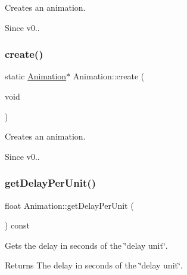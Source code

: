 Creates an animation. \begin{DoxySince}{Since}
v0.. 
\end{DoxySince}
\mbox{\label{classAnimation_ae15070d95f9de1a22d3b897570cda695}} 
\subsubsection{\texorpdfstring{create()}{create()}\hspace{0.1cm}{\footnotesize\ttfamily [2/2]}}
{\footnotesize\ttfamily static \hyperlink{classAnimation}{Animation}$\ast$ Animation\+::create (\begin{DoxyParamCaption}\item[{void}]{ }\end{DoxyParamCaption})\hspace{0.3cm}{\ttfamily [static]}}

Creates an animation. \begin{DoxySince}{Since}
v0.. 
\end{DoxySince}
\mbox{\label{classAnimation_a8bd8ce2036c1772a387a23fb35f78254}} 
\subsubsection{\texorpdfstring{get\+Delay\+Per\+Unit()}{getDelayPerUnit()}\hspace{0.1cm}{\footnotesize\ttfamily [1/2]}}
{\footnotesize\ttfamily float Animation\+::get\+Delay\+Per\+Unit (\begin{DoxyParamCaption}{ }\end{DoxyParamCaption}) const\hspace{0.3cm}{\ttfamily [inline]}}

Gets the delay in seconds of the \char`\"{}delay unit\char`\"{}.

\begin{DoxyReturn}{Returns}
The delay in seconds of the \char`\"{}delay unit\char`\"{}. 
\end{DoxyReturn}
\mbox{\label{classAnimation_a8bd8ce2036c1772a387a23fb35f78254}} 
